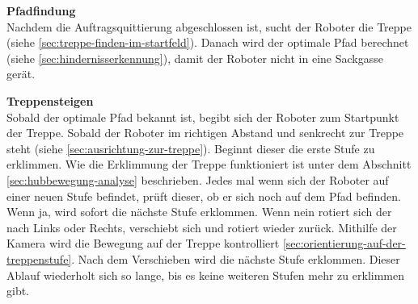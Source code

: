 \textbf{Pfadfindung}\\
Nachdem die Auftragsquittierung abgeschlossen ist, sucht der Roboter die Treppe (siehe \ref{sec:treppe-finden-im-startfeld}). Danach wird der optimale Pfad berechnet (siehe \ref{sec:hindernisserkennung}), damit der Roboter nicht in eine Sackgasse gerät. 

\textbf{Treppensteigen}\\
Sobald der optimale Pfad bekannt ist, begibt sich der Roboter zum Startpunkt der Treppe.  Sobald der Roboter im richtigen Abstand und senkrecht zur Treppe steht (siehe \ref{sec:ausrichtung-zur-treppe}). Beginnt dieser die erste Stufe zu erklimmen. Wie die Erklimmung der Treppe funktioniert ist unter dem Abschnitt \ref{sec:hubbewegung-analyse} beschrieben. Jedes mal wenn sich der Roboter auf einer neuen Stufe befindet, prüft dieser, ob er sich noch auf dem Pfad befinden. Wenn ja, wird sofort die nächste Stufe erklommen. Wenn nein rotiert sich der nach Links oder Rechts, verschiebt sich und rotiert wieder zurück. Mithilfe der Kamera wird die Bewegung auf der Treppe kontrolliert \ref{sec:orientierung-auf-der-treppenstufe}. Nach dem Verschieben wird die nächste Stufe erklommen. Dieser Ablauf wiederholt sich so lange, bis es keine weiteren Stufen mehr zu erklimmen gibt.

